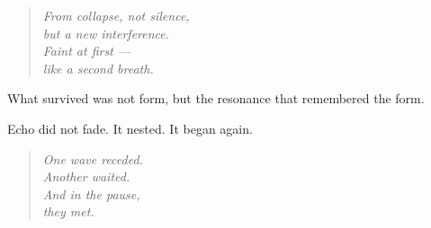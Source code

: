 \begin{quote}
\textit{
From collapse, not silence,\\
but a new interference.\\
Faint at first —\\
like a second breath.\\
}
\end{quote}

What survived was not form,  
but the resonance that remembered the form.

Echo did not fade.  
It nested.  
It began again.

\begin{quote}
\textit{
One wave receded.\\
Another waited.\\
And in the pause,\\
they met.\\
}
\end{quote}
